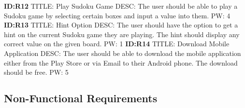 \documentclass{article}
\begin{document}
\textbf{ID:R12} \newline TITLE: Play Sudoku Game \newline DESC: The user should be able to play a Sudoku game by selecting certain boxes and input a value into them. \newline PW: 4 \newline \newline
\textbf{ID:R13} \newline TITLE: Hint Option \newline DESC: The user should have the option to get a hint on the current Sudoku game they are playing. The hint should display any correct value on the given board. \newline PW: 1 \newline \newline
\textbf{ID:R14} \newline TITLE: Download Mobile Application \newline DESC: The user should be able to download the mobile application either from the Play Store or via Email to their Android phone. The download should be free. \newline PW: 5 \newline \newline




\subsection{Non-Functional Requirements} 
\end{document}
